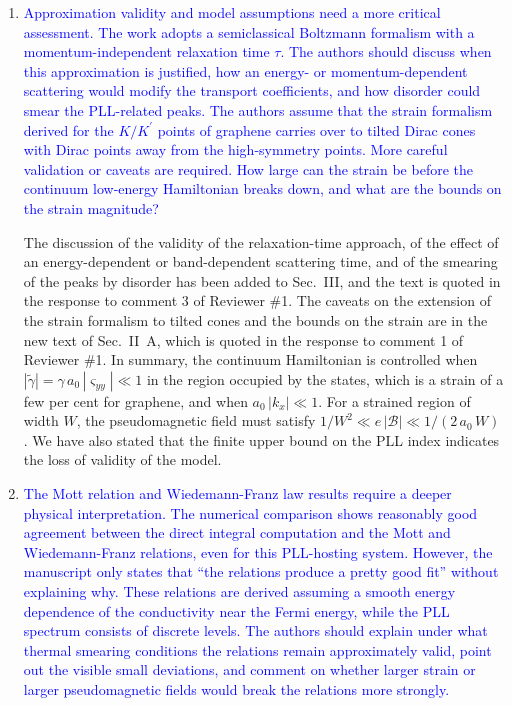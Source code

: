 \documentclass[aps,prb,onecolumn,nofootinbib,citeautoscript,10pt]{revtex4-2}
\begin{document}
\begin{enumerate}
\item \textcolor{blue}{Approximation validity and model assumptions need a more critical assessment. The work adopts a semiclassical Boltzmann formalism with a momentum-independent relaxation time $\tau$. The authors should discuss when this approximation is justified, how an energy- or momentum-dependent scattering would modify the transport coefficients, and how disorder could smear the PLL-related peaks. The authors assume that the strain formalism derived for the $K/K^\prime$ points of graphene carries over to tilted Dirac cones with Dirac points away from the high-symmetry points. More careful validation or caveats are required. How large can the strain be before the continuum low-energy Hamiltonian breaks down, and what are the bounds on the strain magnitude?}

The discussion of the validity of the relaxation-time approach, of the effect of an energy-dependent or band-dependent scattering time, and of the smearing of the peaks by disorder has been added to Sec.~III, and the text is quoted in the response to comment 3 of Reviewer \#1. The caveats on the extension of the strain formalism to tilted cones and the bounds on the strain are in the new text of Sec.~II~A, which is quoted in the response to comment 1 of Reviewer \#1. In summary, the continuum Hamiltonian is controlled when $|\tilde\gamma|=\gamma\,a_0\,|\varsigma_{yy}|\ll1$ in the region occupied by the states, which is a strain of a few per cent for graphene, and when $a_0\,|k_x|\ll1$. For a strained region of width $W$, the pseudomagnetic field must satisfy $1/W^2\ll e\,|\mathcal B|\ll1/(2\,a_0\,W)$. We have also stated that the finite upper bound on the PLL index indicates the loss of validity of the model.\item \textcolor{blue}{The Mott relation and Wiedemann-Franz law results require a deeper physical interpretation. The numerical comparison shows reasonably good agreement between the direct integral computation and the Mott and Wiedemann-Franz relations, even for this PLL-hosting system. However, the manuscript only states that ``the relations produce a pretty good fit'' without explaining why. These relations are derived assuming a smooth energy dependence of the conductivity near the Fermi energy, while the PLL spectrum consists of discrete levels. The authors should explain under what thermal smearing conditions the relations remain approximately valid, point out the visible small deviations, and comment on whether larger strain or larger pseudomagnetic fields would break the relations more strongly.}


\end{enumerate}
\end{document}
